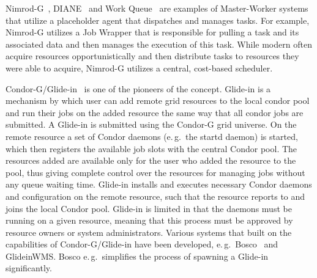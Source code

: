 \documentclass{sig-alternate}
\begin{document}
Nimrod-G~\cite{10.1109/HPC.2000.846563}, DIANE~\cite{diane-thesis} and Work
Queue~\cite{workqueue-pyhpc2011} are examples of Master-Worker systems that
utilize a placeholder agent that dispatches and manages tasks. For example,
Nimrod-G utilizes a Job Wrapper that is responsible for pulling a task and its
associated data and then manages the execution of this task. While modern
\pilotjobs often acquire resources opportunistically and then distribute tasks
to resources they were able to acquire, Nimrod-G utilizes a central,
cost-based scheduler.

Condor-G/Glide-in~\cite{condor-g} is one of the pioneers of the \pilotjob
concept. Glide-in is a mechanism by which user can add remote grid resources
to the local condor pool and run their jobs on the added resource the same way
that all condor jobs are submitted. A Glide-in is submitted using the Condor-G
grid universe. On the remote resource a set of Condor daemons (e.\,g.\ the
startd daemon) is started, which then registers the available job slots with
the central Condor pool. The resources added are available only for the user
who added the resource to the pool, thus giving complete control over the
resources for managing jobs without any queue waiting time. Glide-in installs
and executes necessary Condor daemons and configuration on the remote
resource, such that the resource reports to and joins the local Condor pool.
Glide-in is limited in that the daemons must be running on a given resource,
meaning that this process must be approved by resource owners or system
administrators. Various systems that built on the \pilot capabilities of 
Condor-G/Glide-in have been developed, e.\,g.\ Bosco~\cite{bosco} and 
GlideinWMS. Bosco e.\,g.\ simplifies the process of spawning a Glide-in 
significantly.



\end{document}
